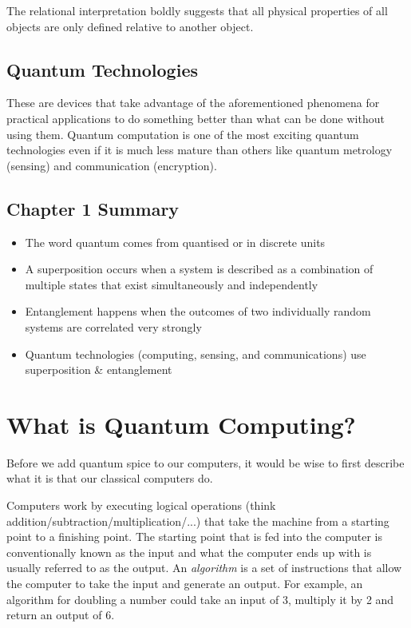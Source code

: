 \documentclass{book}
\begin{document}
The relational interpretation boldly suggests that all physical properties of all objects are only defined relative to another object. 

\section{Quantum Technologies}

These are devices that take advantage of the aforementioned phenomena for practical applications to do something better than what can be done without using them. Quantum computation is one of the most exciting quantum technologies even if it is much less mature than others like quantum metrology (sensing) and communication (encryption).

\section{Chapter 1 Summary} 

\begin{itemize}

    \item The word quantum comes from quantised or in discrete units 
    \item A superposition occurs when a system is described as a combination of multiple states that exist simultaneously and independently
    \item Entanglement happens when the outcomes of two individually random systems are correlated very strongly 
    \item Quantum technologies (computing, sensing, and communications) use superposition \& entanglement
    
\end{itemize}

\chapter{What is Quantum Computing?}

Before we add quantum spice to our computers, it would be wise to first describe what it is that our classical computers do. 

Computers work by executing logical operations (think addition/subtraction/multiplication/...) that take the machine from a starting point to a finishing point. The starting point that is fed into the computer is conventionally known as the input and what the computer ends up with is usually referred to as the output. An \textit{algorithm} is a set of instructions that allow the computer to take the input and generate an output. For example, an algorithm for doubling a number could take an input of 3, multiply it by 2 and return an output of 6. 
\end{document}

